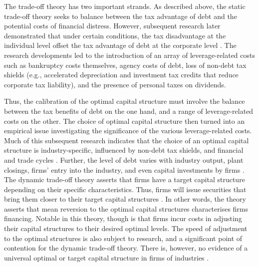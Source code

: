 \documentclass[a4paper,nobind]{templates/ociamthesis}
\begin{document}
The trade-off theory has two important strands. As described above, the static trade-off theory seeks to balance between the tax advantage of debt and the potential costs of financial distress. However, subsequent research later demonstrated that under certain conditions, the tax disadvantage at the individual level offset the tax advantage of debt at the corporate level \autocite{bradley1984existence}. The research developments led to the introduction of an array of leverage-related costs such as bankruptcy costs themselves, agency costs of debt, loss of non-debt tax shields (e.g., accelerated depreciation and investment tax credits that reduce corporate tax liability), and the presence of personal taxes on dividends.

Thus, the calibration of the optimal capital structure must involve the balance between the tax benefits of debt on the one hand, and a range of leverage-related costs on the other. The choice of optimal capital structure then turned into an empirical issue investigating the significance of the various leverage-related costs. Much of this subsequent research indicates that the choice of an optimal capital structure is industry-specific, influenced by non-debt tax shields, and financial and trade cycles \autocite{miao2005optimal}. Further, the level of debt varies with industry output, plant closings, firms' entry into the industry, and even capital investments by firms \autocite{myers2001capital}.
The dynamic trade-off theory asserts that firms have a target capital structure depending on their specific characteristics. Thus, firms will issue securities that bring them closer to their target capital structures \autocite{elsas2014financing}. In other words, the theory asserts that mean reversion to the optimal capital structures characterises firms financing. Notable in this theory, though is that firms incur costs in adjusting their capital structures to their desired optimal levels. The speed of adjustment to the optimal structures is also subject to research, and a significant point of contention for the dynamic trade-off theory. There is, however, no evidence of a universal optimal or target capital structure in firms of industries \autocite{elsas2015dynamic}.
\end{document}
